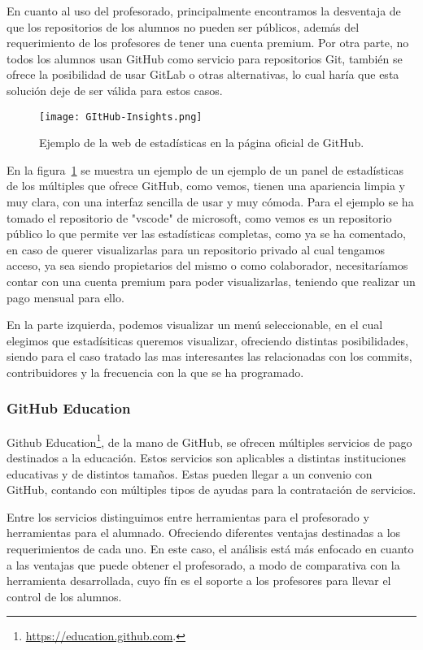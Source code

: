 En cuanto al uso del profesorado, principalmente encontramos la desventaja
de que los repositorios de los alumnos no pueden ser públicos, además del
requerimiento de los profesores de tener una cuenta premium. Por otra
parte, no todos los alumnos usan GitHub como servicio para repositorios
Git, también se ofrece la posibilidad de usar GitLab o otras alternativas,
lo cual haría que esta solución deje de ser válida para estos casos.



\begin{figure}[h!]
  \texttt{[image: GItHub-Insights.png]}
  \caption{Ejemplo de la web de estadísticas en la página oficial de
    GitHub.}
  \label{figure:GithubInsights}
\end{figure}

En la figura~\ref{figure:GithubInsights} se muestra un ejemplo de un
ejemplo de un panel de estadísticas de los múltiples que ofrece GitHub,
como vemos, tienen una apariencia limpia y muy clara, con una interfaz
sencilla de usar y muy cómoda. Para el ejemplo se ha tomado el repositorio
de "vscode" de microsoft, como vemos es un repositorio público lo que
permite ver las estadísticas completas, como ya se ha comentado, en caso de
querer visualizarlas para un repositorio privado al cual tengamos acceso,
ya sea siendo propietarios del mismo o como colaborador, necesitaríamos
contar con una cuenta premium para poder visualizarlas, teniendo que
realizar un pago mensual para ello.

En la parte izquierda, podemos visualizar un menú seleccionable, en el cual
elegimos que estadísiticas queremos visualizar, ofreciendo distintas
posibilidades, siendo para el caso tratado las mas interesantes las
relacionadas con los commits, contribuidores y la frecuencia con la que se
ha programado.

\subsubsection{GitHub Education}

Github Education\footnote{\url{https://education.github.com}.}, de la mano
de GitHub, se ofrecen múltiples servicios de pago destinados a la
educación. Estos servicios son aplicables a distintas instituciones
educativas y de distintos tamaños. Estas pueden llegar a un convenio con
GitHub, contando con múltiples tipos de ayudas para la contratación de
servicios.

Entre los servicios distinguimos entre herramientas para el profesorado y
herramientas para el alumnado. Ofreciendo diferentes ventajas destinadas a
los requerimientos de cada uno. En este caso, el análisis está más enfocado
en cuanto a las ventajas que puede obtener el profesorado, a modo de
comparativa con la herramienta desarrollada, cuyo fín es el soporte a los
profesores para llevar el control de los alumnos.

